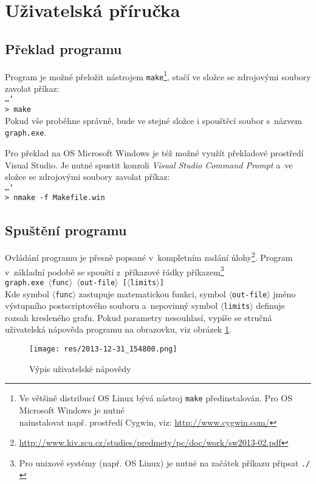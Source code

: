 \documentclass[pdftex,a4paper]{article}
\begin{document}
\newpage
\section{Uživatelská příručka}

\subsection{Překlad programu}
Program je možné přeložit nástrojem \texttt{make}\footnote{Ve většině distribucí OS Linux bývá nástroj \texttt{make} předinstalován. Pro OS Microsoft Windows je nutné\\ nainstalovat např. prostředí Cygwin, viz: \url{http://www.cygwin.com/}}, stačí ve složce se zdrojovými soubory zavolat příkaz:
\\[2mm]
\texttt{\ldots\char`\\ > make}
\\[2mm]
Pokud vše proběhne správně, bude ve stejné složce i spouštěcí soubor s~názvem \texttt{graph.exe}.

Pro překlad na OS Microsoft Windows je též možné využít překladové prostředí Visual Studio. Je nutné spustit konzoli \textit{Visual Studio Command Prompt} a~ve složce se zdrojovými soubory zavolat příkaz:
\\[2mm]
\texttt{\ldots\char`\\ > nmake -f Makefile.win}

\subsection{Spuštění programu}
Ovládání programu je přesně popsané v~kompletním zadání úlohy\footnote{\url{http://www.kiv.zcu.cz/studies/predmety/pc/doc/work/sw2013-02.pdf}}. Program v~základní podobě se spouští z~příkazové řádky příkazem\footnote{Pro unixové systémy (např. OS Linux) je nutné na začátek příkazu připsat \texttt{./}}
\\[2mm]
\texttt{graph.exe $\langle$func$\rangle$ $\langle$out-file$\rangle$ [$\langle$limits$\rangle$]}
\\[2mm]
Kde symbol \texttt{$\langle$func$\rangle$} zastupuje matematickou funkci, symbol \texttt{$\langle$out-file$\rangle$} jméno výstupního postscriptového souboru a~nepovinný symbol \texttt{$\langle$limits$\rangle$} definuje rozsah kresleného grafu. Pokud parametry nesouhlasí, vypíše se stručná uživatelská nápověda programu na obrazovku, viz obrázek \ref{fig:obr1}.
\\

\begin{figure}[h]
\texttt{[image: res/2013-12-31\_154800.png]}
\caption{Výpis uživatelské nápovědy}
\label{fig:obr1}
\end{figure}
\end{document}
